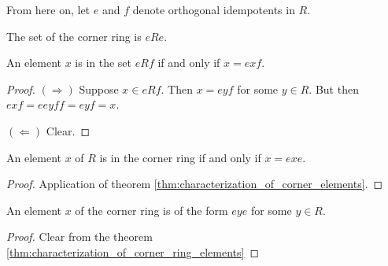 From here on, let $e$ and $f$ denote orthogonal idempotents in $R$.

\begin{definition}
  \label{def:corner_ring}
  The set of the corner ring is $eRe$.
\end{definition}

\begin{theorem}
  \label{thm:characterization_of_corner_elements}
  \leanok
  An element $x$ is in the set $e R f$ if and only if $x = e x f$.
\end{theorem}
\begin{proof}
  \leanok
  $(\Rightarrow)$ Suppose $x \in e R f$. Then $x = e y f$ for some $y \in R$. But then $e x f = e e y f f = e y f = x$.

  $(\Leftarrow)$ Clear.
\end{proof}


\begin{theorem}
  \label{thm:characterization_of_corner_ring_elements}
  \leanok
  An element $x$ of $R$ is in the corner ring if and only if $x = e x e$.
\end{theorem}
\begin{proof}
  \leanok
  Application of theorem \ref{thm:characterization_of_corner_elements}.
\end{proof}

\begin{theorem}
  \label{thm:characterization_of_corner_ring_elements'}
  \leanok
  An element $x$ of the corner ring is of the form $e y e$ for some $y \in R$.
\end{theorem}
\begin{proof}
  \leanok
  Clear from the theorem \ref{thm:characterization_of_corner_ring_elements}
\end{proof}

